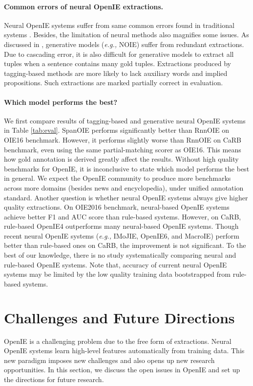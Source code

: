 \documentclass{article}
\newcommand{\eg}{\emph{e.g.,}\xspace}
\begin{document}
\paragraph{Common errors of neural OpenIE extractions.}
Neural OpenIE systems suffer from same common errors found in traditional systems \cite{schneider-etal-2017-analysing}. 
Besides, the limitation of neural methods also magnifies some issues. 
As discussed in \cite{kolluru-etal-2020-imojie}, generative models (\eg NOIE) suffer from redundant extractions. Due to cascading error, it is also difficult for generative models to extract all tuples when a sentence contains many gold tuples.
Extractions produced by tagging-based methods are more likely to lack auxiliary words and implied propositions. Such extractions are marked partially correct in evaluation.

\paragraph{Which model performs the best?}
We first compare results of tagging-based and generative neural OpenIE systems in Table \ref{tab:eval}. SpanOIE performs significantly better than RnnOIE on OIE16 benchmark. However, it performs slightly worse than RnnOIE on CaRB benchmark, even using the same partial-matching scorer as OIE16. This means how gold annotation is derived greatly affect the results. Without high quality benchmarks for OpenIE, it is inconclusive to state which model performs the best in general. We expect the OpenIE community to produce more benchmarks across more domains (besides news and encyclopedia), under unified annotation standard.
Another question is whether neural OpenIE systems always give higher quality extractions.
On OIE2016 benchmark, neural-based OpenIE systems achieve better F1 and AUC score than rule-based systems. However, on CaRB, rule-based OpenIE4 outperforms many neural-based OpenIE systems.
Though recent neural OpenIE systems (\eg IMoJIE, OpenIE6, and MacroIE) perform better than rule-based ones on CaRB, the improvement is not significant. To the best of our knowledge, there is no study systematically comparing neural and rule-based OpenIE systems. Note that, accuracy of current neural OpenIE systems may be limited by the low quality training data bootstrapped from rule-based systems.

\section{Challenges and Future Directions}
\label{sec:future}
OpenIE is a challenging problem due to the free form of extractions. 
Neural OpenIE systems learn high-level features automatically from training data. This new paradigm imposes new challenges and also opens up new research opportunities.
In this section, we discuss the open issues in OpenIE and set up the directions for future research.
\end{document}
